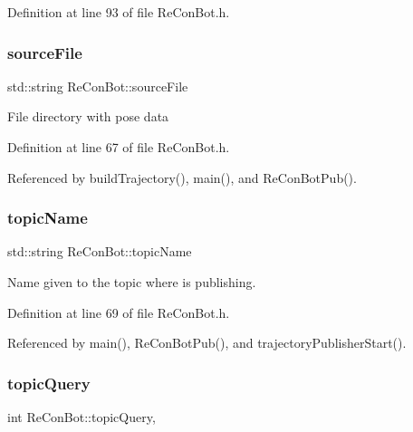 Definition at line 93 of file Re\+Con\+Bot.\+h.

\mbox{\label{class_re_con_bot_a65cf4bed9bbabd92e1265d05507e0945}} 
\subsubsection{\texorpdfstring{source\+File}{sourceFile}}
{\footnotesize\ttfamily std\+::string Re\+Con\+Bot\+::source\+File\hspace{0.3cm}{\ttfamily [inherited]}}

File directory with pose data 

Definition at line 67 of file Re\+Con\+Bot.\+h.



Referenced by build\+Trajectory(), main(), and Re\+Con\+Bot\+Pub().

\mbox{\label{class_re_con_bot_a1d91d2ea8c0f16340440357906fb9ebf}} 
\subsubsection{\texorpdfstring{topic\+Name}{topicName}}
{\footnotesize\ttfamily std\+::string Re\+Con\+Bot\+::topic\+Name\hspace{0.3cm}{\ttfamily [inherited]}}

Name given to the topic where is publishing. 

Definition at line 69 of file Re\+Con\+Bot.\+h.



Referenced by main(), Re\+Con\+Bot\+Pub(), and trajectory\+Publisher\+Start().

\mbox{\label{class_re_con_bot_aba20d307ac1b2e6b22f96da83a0d937d}} 
\subsubsection{\texorpdfstring{topic\+Query}{topicQuery}}
{\footnotesize\ttfamily int Re\+Con\+Bot\+::topic\+Query\hspace{0.3cm}{\ttfamily [protected]}, {\ttfamily [inherited]}}



